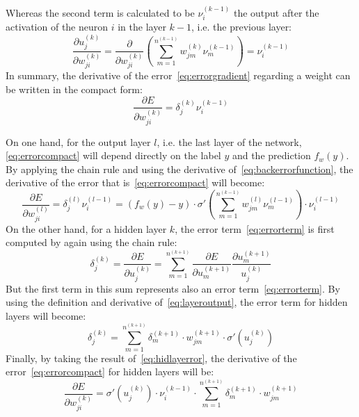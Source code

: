 Whereas the second term is calculated to be $\nu_i^{(k-1)}$ the output after the activation of the neuron $i$ in the layer $k-1$, i.e. the previous layer:
\begin{equation}
  \frac{\partial u_j^{(k)}}{\partial w^{(k)}_{ji}} = \frac{\partial}{\partial w^{(k)}_{ji}} \left( \sum^{n^{(k-1)}}_{m=1} w^{(k)}_{jm} \nu^{(k-1)}_m \right) = \nu_i^{(k-1)}
\end{equation}
In summary, the derivative of the error~\eqref{eq:errorgradient} regarding a weight can be written in the compact form:
\begin{equation}
  \label{eq:errorcompact}
  \frac{\partial E}{\partial w^{(k)}_{ji}} = \delta_j^{(k)} \nu_i^{(k-1)}
\end{equation}

On one hand, for the output layer $l$, i.e. the last layer of the network, \eqref{eq:errorcompact} will depend directly on the label $y$ and the prediction $f_w(y)$. By applying the chain rule and using the derivative of~\eqref{eq:backerrorfunction}, the derivative of the error that is~\eqref{eq:errorcompact} will become:
\begin{equation}
  \frac{\partial E}{\partial w^{(l)}_{ji}} = \delta_j^{(l)} \nu_i^{(l-1)} = (f_w(y) - y) \cdot \sigma'\left( \sum^{n^{(k-1)}}_{m=1} w^{(l)}_{jm} \nu^{(l-1)}_m \right) \cdot \nu_i^{(l-1)}
\end{equation}
On the other hand, for a hidden layer $k$, the error term~\eqref{eq:errorterm} is first computed by again using the chain rule:
\begin{equation}
  \delta^{(k)}_j = \frac{\partial E}{\partial u_j^{(k)}} = \sum^{n^{(k+1)}}_{m=1} \frac{\partial E}{\partial u_m^{(k+1)}} \frac{\partial u_m^{(k+1)}}{u_j^{(k)}}
\end{equation}
But the first term in this sum represents also an error term~\eqref{eq:errorterm}. By using the definition and derivative of~\eqref{eq:layeroutput}, the error term for hidden layers will become:
\begin{equation}
  \label{eq:hidlayerror}
  \delta^{(k)}_j = \sum^{n^{(k+1)}}_{m=1} \delta^{(k+1)}_m \cdot w^{(k+1)}_{jm} \cdot \sigma'(u^{(k)}_j)
\end{equation}
Finally, by taking the result of~\eqref{eq:hidlayerror}, the derivative of the error~\eqref{eq:errorcompact} for hidden layers will be:
\begin{equation}
  \frac{\partial E}{\partial w^{(k)}_{ji}} = \sigma'(u^{(k)}_j) \cdot \nu_i^{(k-1)} \cdot \sum^{n^{(k+1)}}_{m=1} \delta^{(k+1)}_m \cdot w^{(k+1)}_{jm}
\end{equation}
